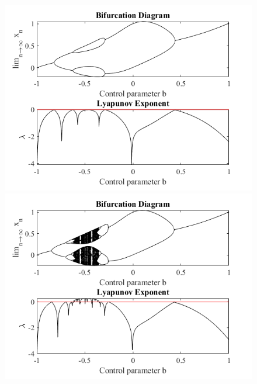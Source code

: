 \documentclass[a4paper,12pt,notitlepage]{article}
\begin{document}
\begin{figure}[h]
    \centering
        \centering
        \includegraphics[width=\textwidth]{a=4_5.png} 

        \centering
        \includegraphics[width=\textwidth]{a=5.png} 
\end{figure}
\end{document}
